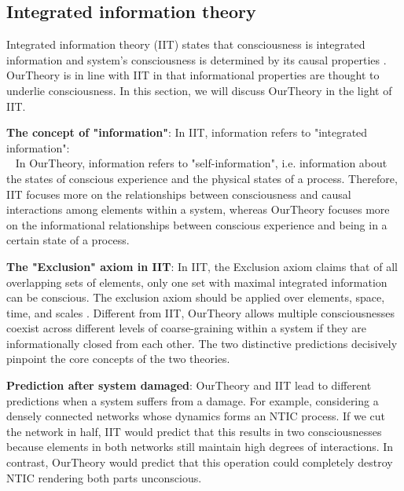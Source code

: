 \documentclass[utf8]{article}
\begin{document}
		\subsection{Integrated information theory}
            Integrated information theory (IIT) states that consciousness is integrated information and system's consciousness is determined by its causal properties \citep{tononi2016integrated}. \ac{OurTheory} is in line with IIT in that informational properties are thought to underlie consciousness. In this section, we will discuss \ac{OurTheory} in the light of IIT. 
            
            \textbf{The concept of "information"}: In IIT, information refers to "integrated information":\\ ~\citep{tononi2016integrated} In \ac{OurTheory}, information refers to "self-information", i.e. information about the states of conscious experience and the physical states of a process. Therefore, IIT focuses more on the relationships between consciousness and causal interactions among elements within a system, whereas \ac{OurTheory} focuses more on the informational relationships between conscious experience and being in a certain state of a process. 
		    
		    \textbf{The "Exclusion" axiom in IIT}: In IIT, the Exclusion axiom claims that of all overlapping sets of elements, only one set with maximal integrated information can be conscious. The exclusion axiom should be applied over elements, space, time, and scales \citep{oizumi2014phenomenology, hoel2016can}. Different from IIT, \ac{OurTheory} allows multiple consciousnesses coexist across different levels of coarse-graining within a system if they are informationally closed from each other. The two distinctive predictions decisively pinpoint the core concepts of the two theories. 
		     
		    
		    \textbf{Prediction after system damaged}: \ac{OurTheory} and IIT lead to different predictions when a system suffers from a damage. For example, considering a densely connected networks whose dynamics forms an NTIC process. If we cut the network in half, IIT would predict that this results in two consciousnesses because elements in both networks still maintain high degrees of interactions. In contrast, \ac{OurTheory} would predict that this operation could completely destroy NTIC rendering both parts unconscious.
		    
\end{document}

